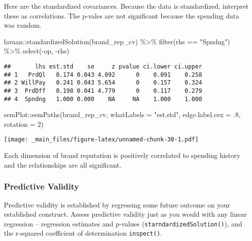 \documentclass[
]{book}
\newenvironment{Shaded}{\begin{snugshade}}{\end{snugshade}}
\newcommand{\AttributeTok}[1]{\textcolor[rgb]{0.77,0.63,0.00}{#1}}
\newcommand{\DecValTok}[1]{\textcolor[rgb]{0.00,0.00,0.81}{#1}}
\newcommand{\FunctionTok}[1]{\textcolor[rgb]{0.00,0.00,0.00}{#1}}
\newcommand{\NormalTok}[1]{#1}
\newcommand{\SpecialCharTok}[1]{\textcolor[rgb]{0.00,0.00,0.00}{#1}}
\newcommand{\StringTok}[1]{\textcolor[rgb]{0.31,0.60,0.02}{#1}}
\theoremstyle{definition}
\theoremstyle{definition}
\theoremstyle{definition}
\theoremstyle{definition}
\theoremstyle{remark}
\begin{document}
Here are the standardized covariances. Because the data is standardized, interpret these as correlations. The p-vales are not significant because the spending data was random.

\begin{Shaded}
\begin{Highlighting}[]
\NormalTok{lavaan}\SpecialCharTok{::}\FunctionTok{standardizedSolution}\NormalTok{(brand\_rep\_cv) }\SpecialCharTok{\%\textgreater{}\%} 
  \FunctionTok{filter}\NormalTok{(rhs }\SpecialCharTok{==} \StringTok{"Spndng"}\NormalTok{) }\SpecialCharTok{\%\textgreater{}\%}
  \FunctionTok{select}\NormalTok{(}\SpecialCharTok{{-}}\NormalTok{op, }\SpecialCharTok{{-}}\NormalTok{rhs)}
\end{Highlighting}
\end{Shaded}

\begin{verbatim}
##       lhs est.std    se     z pvalue ci.lower ci.upper
## 1   PrdQl   0.174 0.043 4.092      0    0.091    0.258
## 2 WillPay   0.241 0.043 5.654      0    0.157    0.324
## 3  PrdDff   0.198 0.041 4.779      0    0.117    0.279
## 4  Spndng   1.000 0.000    NA     NA    1.000    1.000
\end{verbatim}

\begin{Shaded}
\begin{Highlighting}[]
\NormalTok{semPlot}\SpecialCharTok{::}\FunctionTok{semPaths}\NormalTok{(brand\_rep\_cv, }\AttributeTok{whatLabels =} \StringTok{"est.std"}\NormalTok{, }\AttributeTok{edge.label.cex =}\NormalTok{ .}\DecValTok{8}\NormalTok{, }\AttributeTok{rotation =} \DecValTok{2}\NormalTok{)}
\end{Highlighting}
\end{Shaded}

\texttt{[image: \_main\_files/figure-latex/unnamed-chunk-30-1.pdf]}

Each dimension of brand reputation is positively correlated to spending history and the relationships are all significant.

\hypertarget{predictive-validity}{%
\subsubsection{Predictive Validity}\label{predictive-validity}}

Predictive validity is established by regressing some future outcome on your established construct. Assess predictive validity just as you would with any linear regression -- regression estimates and p-values (\texttt{starndardizedSolution()}), and the r-squared coefficient of determination \texttt{inspect()}.
\end{document}
